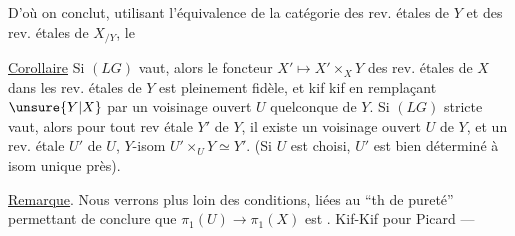 
D'où on conclut, utilisant l'équivalence de la catégorie
des rev. étales de $Y$ et des rev. étales de $X_{/Y}$, le

\uline{Corollaire} Si $(LG)$ vaut, alors le foncteur
$X'\longmapsto X'\times_XY$ des rev. étales de $X$ dans les
rev. étales de $Y$ est pleinement fidèle,
et kif kif en remplaçant $\unsure{Y|X}$ par un voisinage
ouvert $U$ quelconque de $Y$.
Si $(LG)$ stricte vaut, alors pour tout rev étale $Y'$ de $Y$,
il existe un 
voisinage ouvert $U$ de $Y$, et un rev. étale $U'$ de $U$,
 
$Y$-isom $U'\times_UY\simeq Y'$.
(Si $U$ est choisi, $U'$ est bien déterminé à isom unique près).

\uline{Remarque}. Nous verrons plus loin des conditions,
liées au ``th de pureté'' permettant de conclure que
$\pi_1(U)\longrightarrow\pi_1(X)$ est
.
Kif-Kif pour Picard ---

